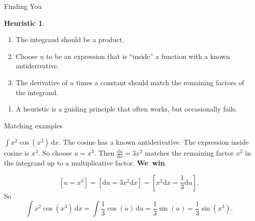 \documentclass[fleqn]{beamer}
\theoremstyle{definition}
\newtheorem{heuristic}{Heuristic}
\newenvironment{checklist}{
  \begin{enumerate}[\ding{51}]
    \addtolength{\itemsep}{-0.0\itemsep}}
  {\end{enumerate}}
\begin{document}
\begin{frame}{Finding You}

\begin{heuristic}

\begin{checklist}

\item The integrand should be a product.

\item Choose \(u\) to be an expression that is ``inside'' a function with a known antiderivative.

\item The derivative of \(u\) times a constant should match the remaining factors of the integrand.
\end{checklist}

\end{heuristic}

\begin{checklist}

\item A heuristic is a guiding principle that often works, but occasionally  fails. 
\end{checklist} 
\end{frame}

\begin{frame}{Matching examples}


 \( \int x^2 \cos(x^3) \, \mathrm{d} x \).   The cosine has a known antiderivative.  The expression inside cosine is \(x^3\).  So choose \(u = x^3\).   Then
\(\frac{\mathrm{d} u}{\mathrm{d} x} = 3 x^2\) matches the remaining factor  \(x^2\) in the integrand up to a multiplicative factor.  \mbox{\textbf{We win}}.

\[
    [u = x^3] = [\mathrm{d} u = 3 x^2 \mathrm{d} x] = \left[  x^2 \mathrm{d} x = \frac{1}{3}  \mathrm{d} u \right].
\]
So
\[
 \int x^2 \cos(x^3) \, \mathrm{d} x = \int \frac{1}{3} \cos(u) \, \mathrm{d} u = \frac{1}{3} \sin(u) =  \frac{1}{3} \sin(x^3).
\]

\end{frame}
\end{document}
